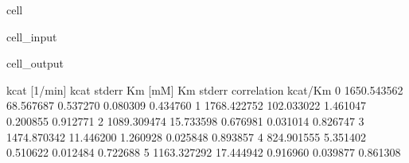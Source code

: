 \documentclass[letterpaper,10pt,english]{jupyterBook}
\begin{document}
\begin{sphinxuseclass}{cell}
\begin{sphinxVerbatimInput}
\begin{sphinxuseclass}{cell_input}
\begin{sphinxVerbatim}[commandchars=\\\{\}]
      \PYG{p}{[}\PYG{p}{]}
       
        \PYG{p}{[}\PYG{p}{]}


  

\end{sphinxVerbatim}

\end{sphinxuseclass}\end{sphinxVerbatimInput}
\begin{sphinxVerbatimOutput}

\begin{sphinxuseclass}{cell_output}
\begin{sphinxVerbatim}[commandchars=\\\{\}]
   kcat [1/min]  kcat stderr   Km [mM]  Km stderr  correlation kcat/Km
0   1650.543562    68.567687  0.537270   0.080309            \PYGZhy{}0.434760
1   1768.422752   102.033022  1.461047   0.200855             0.912771
2   1089.309474    15.733598  0.676981   0.031014             0.826747
3   1474.870342    11.446200  1.260928   0.025848             0.893857
4    824.901555     5.351402  0.510622   0.012484             0.722688
5   1163.327292    17.444942  0.916960   0.039877             0.861308
\end{sphinxVerbatim}

\end{sphinxuseclass}\end{sphinxVerbatimOutput}

\end{sphinxuseclass}
\end{document}
